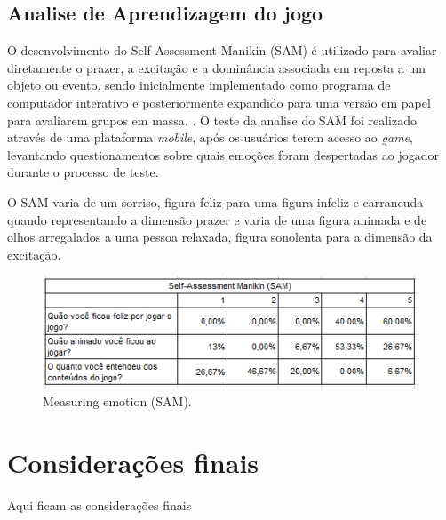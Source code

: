 \documentclass[10pt, conference, compsocconf]{IEEEtran}
\begin{document}
	
	
\subsection{Analise de Aprendizagem do jogo}	
O desenvolvimento do Self-Assessment Manikin (SAM) é utilizado para avaliar diretamente o prazer, a excitação e a dominância associada em reposta a um objeto ou evento, sendo inicialmente implementado como programa de computador interativo e posteriormente expandido para uma versão em papel para avaliarem grupos em massa. \cite{bradley1994measuring}. O teste da analise do SAM foi realizado através de uma plataforma \textit{mobile}, após os usuários terem acesso ao \textit{game}, levantando questionamentos sobre quais emoções foram despertadas ao jogador durante o processo de teste.
 
O SAM varia de um sorriso, figura feliz para uma figura infeliz e carrancuda quando representando a dimensão prazer e varia de uma figura animada e de olhos arregalados a uma pessoa relaxada, figura sonolenta para a dimensão da excitação. 

\begin{figure}[htbp]
	\centering
	\includegraphics[width=.4\textwidth]{Figuras/sam.png}
	\caption{Measuring emotion (SAM).}\label{diagramaTelas}	
\end{figure}

\section{Considerações finais}
Aqui ficam as considerações finais  




\end{document}
